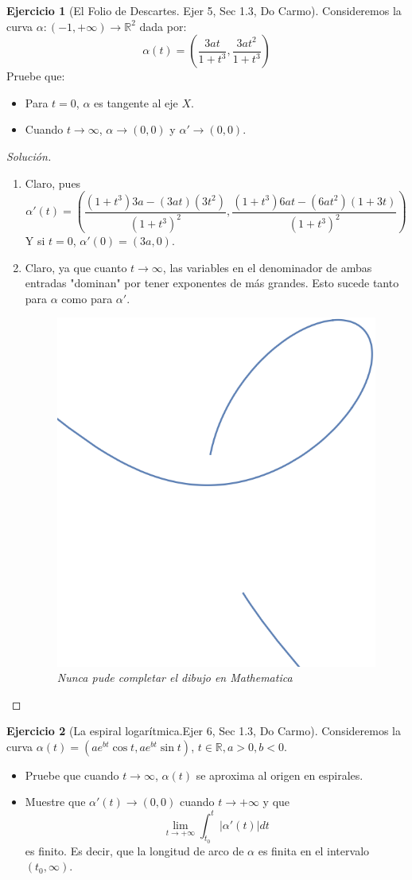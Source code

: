 \documentclass[spanish]{book}
\theoremstyle{definition}
\newtheorem*{ejer}{Ejercicio}
\newcommand{\R}{\mathbb{R}}
\begin{document}
\begin{ejer}[El Folio de Descartes. Ejer 5, Sec 1.3, Do Carmo] Consideremos la curva $\alpha:(-1,+\infty)\to\R^2$ dada por:
\[\alpha(t)=\left(\frac{3at}{1+t^3},\frac{3at^2}{1+t^3}\right)\]
Pruebe que:
\begin{itemize}
	\item Para $t=0$, $\alpha$ es tangente al eje $X$.
	\item Cuando $t\to\infty$, $\alpha \to (0,0)$ y $\alpha'\to(0,0).$
\end{itemize}
\end{ejer}

\begin{proof}[Solución]\leavevmode
	\begin{enumerate}
		\item Claro, pues
		\[\alpha'(t)=\left(\frac{(1+t^3)3a-(3at)(3t^2)}{(1+t^3)^2}, \frac{(1+t^3)6at-(6at^2)(1+3t)}{(1+t^3)^2}\right)\]
		Y si $t=0$, $\alpha'(0)=(3a,0)$.
		
		\item Claro, ya que cuanto $t\to\infty$, las variables en el denominador de ambas entradas "dominan" por tener exponentes de más grandes. Esto sucede tanto para $\alpha$ como para $\alpha'$.
		\begin{figure}[H]
			\centering
			\includegraphics[width=0.3\linewidth]{curvas2}
			\caption*{\textit{Nunca pude completar el dibujo en Mathematica \Smiley}}
		\end{figure}
		\end{enumerate}
\end{proof}

\begin{ejer}[La espiral logarítmica.Ejer 6, Sec 1.3, Do Carmo] Consideremos la curva $\alpha(t)=(ae^{bt}\cos{t}, ae^{bt}\sin{t})$, $t\in\R,a>0,b<0$.
\begin{itemize}
	\item Pruebe que cuando $t\to\infty$, $\alpha(t)$ se aproxima al origen en espirales.
	\item Muestre que $\alpha'(t)\to(0,0)$ cuando $t\to+\infty$ y que
	\[\lim_{t\to+\infty}\int_{t_0}^t|\alpha'(t)| dt\]
	es finito. Es decir, que la longitud de arco de $\alpha$ es finita en el intervalo $(t_0,\infty)$.
\end{itemize}
\end{ejer}
\end{document}
